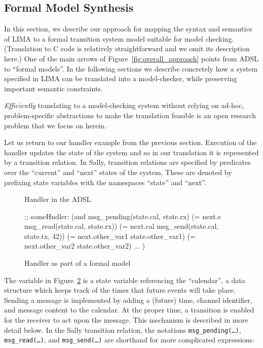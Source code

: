\subsection{Formal Model Synthesis}\label{ssec:formal-model-synth}

In this section, we describe our approach for mapping the syntax and semantics
of LIMA to a formal transition system model suitable for model checking.
(Translation to C code is relatively straightforward and we omit its
description here.) One of the main arrows of Figure~\ref{fig:overall_approach}
points from ADSL to ``formal models''.  In the following sections we describe
concretely how a system specified in LIMA can be translated into a
model-checker, while preserving important semantic constraints.

\emph{Efficiently} translating to a model-checking system without
relying on ad-hoc, problem-specific abstractions to make the translation
feasible is an open research problem that we focus on herein.

Let us return to our handler example from the previous section. Execution of
the handler updates the state of the system and so in our translation it is
represented by a transition relation. In Sally, transition relations are
specified by predicates over the ``current'' and ``next'' states of the
system. These are denoted by prefixing state variables with the namespaces
``state'' and ``next''.

\begin{figure}[ht]
\centering
{}
\caption{Handler in the ADSL}
\label{fig:adsl-handler}
\end{figure}
%
%
\begin{figure}
\centering
\begin{sally}
;; someHndler:
(and msg_pending(state.cal, state.rx)
   (= next.s           msg_read(state.cal, state.rx))
   (= next.cal         msg_send(state.cal, state.tx, 42))
   (= next.other_var1  state.other_var1)
   (= next.other_var2  state.other_var2)
   ... )
\end{sally}
\caption{Handler as part of a formal model}
\label{fig:sally-handler}
\end{figure}

The variable  in Figure~\ref{fig:sally-handler} is a state variable
referencing the ``calendar'', a data structure which keeps track of the times
that future events will take place. Sending a message is
implemented by adding a (future) time, channel identifier, and message content
to the calendar. At the proper time, a transition is enabled for the receiver
to act upon the message. This mechanism is described in more detail below. In
the Sally transition relation, the notations \texttt{msg\_pending(\ldots)},
\texttt{msg\_read(\ldots)}, and \texttt{msg\_send(\ldots)} are shorthand for more
complicated expressions:

